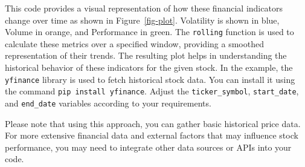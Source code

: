 \documentclass[
  letterpaper,
  DIV=11,
  numbers=noendperiod]{scrreprt}
\begin{document}
This code provides a visual representation of how these financial
indicators change over time as shown in Figure~\ref{fig-plot}.
Volatility is shown in blue, Volume in orange, and Performance in green.
The \texttt{rolling} function is used to calculate these metrics over a
specified window, providing a smoothed representation of their trends.
The resulting plot helps in understanding the historical behavior of
these indicators for the given stock. In the example, the
\texttt{yfinance} library is used to fetch historical stock data. You
can install it using the command \texttt{pip\ install\ yfinance}. Adjust
the \texttt{ticker\_symbol}, \texttt{start\_date}, and
\texttt{end\_date} variables according to your requirements.

Please note that using this approach, you can gather basic historical
price data. For more extensive financial data and external factors that
may influence stock performance, you may need to integrate other data
sources or APIs into your code.
\end{document}
